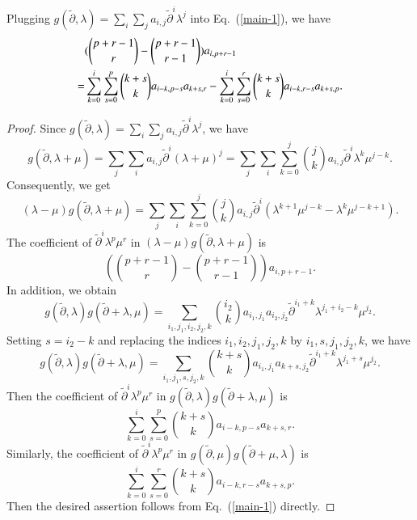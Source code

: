 \documentclass[12pt]{amsart}
\begin{document}
\begin{lem}
Plugging $g(\widetilde{\partial}, \lambda)=\sum_i\sum_j a_{i,j}\widetilde{\partial}^i \lambda^j$ into Eq.~(\ref{main-1}), we have
\begin{equation}\label{e-1}
\aligned
&(\binom{p+r-1}{r}-\binom{p+r-1}{r-1})a_{i,p+r-1}\\
=&\sum_{k=0}^i\sum_{s=0}^p\binom{k+s}{k}a_{i-k,p-s}a_{k+s,r}-\sum_{k=0}^i\sum_{s=0}^r\binom{k+s}{k}a_{i-k, r-s}a_{k+s,p}.
\endaligned
\end{equation}
\end{lem}
\begin{proof}
Since $g(\widetilde{\partial}, \lambda)=\sum_i\sum_j a_{i,j}\widetilde{\partial}^i \lambda^j$, we have
\begin{equation*}
g(\widetilde{\partial}, \lambda+\mu)=\sum_j\sum_i a_{i,j}\widetilde{\partial}^i (\lambda+\mu)^j
=\sum_j\sum_i\sum_{k=0}^j\binom{j}{k} a_{i,j}\widetilde{\partial}^i\lambda^k\mu^{j-k}.
\end{equation*}
Consequently, we get
\begin{equation*}
(\lambda-\mu)g(\widetilde{\partial}, \lambda+\mu)=\sum_j\sum_i\sum_{k=0}^j \binom{j}{k} a_{i,j}\widetilde{\partial}^i(\lambda^{k+1}\mu^{j-k}-\lambda^k\mu^{j-k+1}).
\end{equation*}
The coefficient of $\widetilde{\partial}^i\lambda^p\mu^r$ in $(\lambda-\mu)g(\widetilde{\partial}, \lambda+\mu)$
is $$(\binom{p+r-1}{r}-\binom{p+r-1}{r-1})a_{i,p+r-1}.$$
In addition, we obtain
\begin{equation*}
g(\widetilde{\partial}, \lambda)g(\widetilde{\partial}+\lambda, \mu)
=\sum_{i_1,j_1,i_2,j_2, k} \binom{i_2}{k}a_{i_1,j_1}a_{i_2,j_2}\widetilde{\partial}^{i_1+k}\lambda^{j_1+i_2-k}\mu^{j_2}.
\end{equation*}
Setting $s=i_2-k$ and replacing the indices $i_1,i_2,j_1,j_2,k$ by $i_1,s,j_1,j_2,k$, we have
\begin{equation*}
g(\widetilde{\partial}, \lambda)g(\widetilde{\partial}+\lambda, \mu)
=\sum_{i_1,j_1,s,j_2, k} \binom{k+s}{k}a_{i_1,j_1}a_{k+s,j_2}\widetilde{\partial}^{i_1+k}\lambda^{j_1+s}\mu^{j_2}.
\end{equation*}
Then the coefficient of $\widetilde{\partial}^i\lambda^p\mu^r$ in $g(\widetilde{\partial}, \lambda)g(\widetilde{\partial}+\lambda, \mu)$
is $$\sum_{k=0}^i\sum_{s=0}^p\binom{k+s}{k}a_{i-k,p-s}a_{k+s,r}.$$
Similarly, the coefficient of $\widetilde{\partial}^i\lambda^p\mu^r$ in $g(\widetilde{\partial}, \mu)g(\widetilde{\partial}+\mu, \lambda)$
is $$\sum_{k=0}^i\sum_{s=0}^r\binom{k+s}{k}a_{i-k, r-s}a_{k+s,p}.$$
Then the desired assertion follows from Eq.~(\ref{main-1}) directly.\end{proof}
\end{document}
